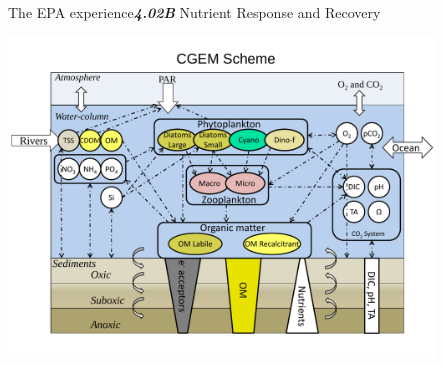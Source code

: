 \documentclass[serif]{beamer}\usepackage[]{graphicx}\usepackage[]{color}
\newcommand{\emtxt}[1]{\textbf{\textit{#1}}}
\begin{document}
\begin{frame}{The EPA experience}{\emtxt{4.02B} Nutrient Response and Recovery}
\vspace{0.15in}
\centerline{\includegraphics[trim= 0cm 0cm 0cm 2cm, clip=true,width=0.85\textwidth]{fig/CGEM.pdf}}
\end{frame}
\end{document}
